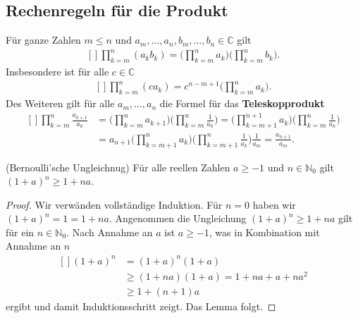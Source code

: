 \documentclass[../Analysis1_script.tex]{subfiles}
\begin{document}
\subsection{Rechenregeln für die Produkt}

Für ganze Zahlen $m \leq n$ und $a_m,\ldots ,a_n,b_m,\ldots ,b_n \in \mathbb {C}$ gilt
\[\begin{aligned}[]
	\prod _{k=m}^n (a_kb_k) = \bigg (\prod _{k=m}^n a_k\bigg ) \bigg (\prod _{k=m}^n b_k\bigg ).
\end{aligned}\]
Insbesondere ist für alle $c\in \mathbb {C}$
\[\begin{aligned}[]
	\prod _{k=m}^n (ca_k) = c^{n-m+1}\bigg (\prod _{k=m}^n a_k\bigg ).
\end{aligned}\] 
Des Weiteren gilt für alle $a_m,\ldots ,a_n$ die Formel für das \textbf{Teleskopprodukt}
\[\begin{aligned}[]
	\prod _{k=m}^n \frac {a_{k+1}}{a_k} &= \bigg (\prod _{k=m}^n a_{k+1}\bigg )\bigg ( \prod _{k=m}^n \frac {1}{a_k}\bigg ) = \bigg (\prod _{k=m+1}^{n+1} a_{k}\bigg )\bigg ( \prod _{k=m}^n \frac {1}{a_k}\bigg )\\ 
	&= a_{n+1}\bigg (\prod _{k=m+1}^{n} a_{k}\bigg )\bigg ( \prod _{k=m+1}^n \frac {1}{a_k}\bigg )\frac {1}{a_m} = \frac {a_{n+1}}{a_m}.
\end{aligned}\]

\begin{lemma}{(Bernoulli'sche Ungleichnug)}
	Für alle reellen Zahlen $a \geq -1$ und $n \in \mathbb{N}_0$ gilt $(1 + a)^n \geq 1 + na$.
\end{lemma}

\begin{proof}
	Wir verwänden vollständige Induktion. Für $n = 0$ haben wir $(1 + a)^n = 1 = 1 + na$. Angenommen die Ungleichung $(1 + a) ^ n \geq 1 + na$ gilt für ein $n \in \mathbb{N}_0$. Nach Annahme an $a$ ist $a \geq -1$, was in Kombination mit Annahme an $n$ 
	\[\begin{aligned}[]
		(1 + a)^n &= (1 + a)^n (1 + a) \\
			&\geq (1 + na)(1 + a) = 1 + na + a + na^2 \\
			&\geq 1 + (n+1)a
	\end{aligned}\]
	ergibt und damit Induktionsschritt zeigt. Das Lemma folgt. 
\end{proof}
\end{document}
